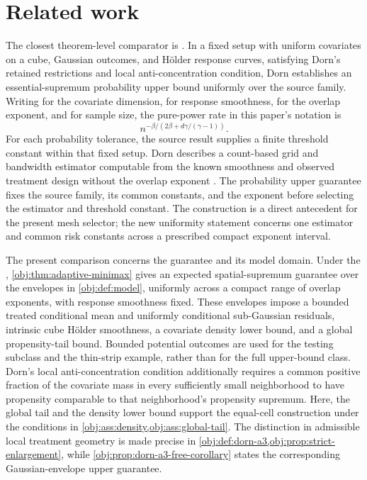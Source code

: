 \section{Related work}

The closest theorem-level comparator is \citet[Assumptions 1--3 and Theorem 1(ii), p. 12]{Dorn2026GlobalOverlap}. In a fixed setup with uniform covariates on a cube, Gaussian outcomes, and Hölder response curves, satisfying Dorn's retained restrictions and local anti-concentration condition, Dorn establishes an essential-supremum probability upper bound uniformly over the source family. Writing  for the covariate dimension,  for response smoothness,  for the overlap exponent, and  for sample size, the pure-power rate in this paper's notation is
\[
n^{-\beta/(2\beta+d\gamma/(\gamma-1))}.
\]
For each probability tolerance, the source result supplies a finite threshold constant within that fixed setup. Dorn describes a count-based grid and bandwidth estimator computable from the known smoothness and observed treatment design without the overlap exponent \citep[Lemmas 11 and 13, pp. 23--24; proof, pp. 27--28]{Dorn2026GlobalOverlap}. The probability upper guarantee fixes the source family, its common constants, and the exponent before selecting the estimator and threshold constant. The construction is a direct antecedent for the present mesh selector; the new uniformity statement concerns one estimator and common risk constants across a prescribed compact exponent interval.

The present comparison concerns the guarantee and its model domain. Under the , \cref{obj:thm:adaptive-minimax} gives an expected spatial-supremum guarantee over the envelopes in \cref{obj:def:model}, uniformly across a compact range of overlap exponents, with response smoothness fixed. These envelopes impose a bounded treated conditional mean and uniformly conditional sub-Gaussian residuals, intrinsic cube Hölder smoothness, a covariate density lower bound, and a global propensity-tail bound. Bounded potential outcomes are used for the testing subclass and the thin-strip example, rather than for the full upper-bound class. Dorn's local anti-concentration condition additionally requires a common positive fraction of the covariate mass in every sufficiently small neighborhood to have propensity comparable to that neighborhood's propensity supremum. Here, the global tail and the density lower bound support the equal-cell construction under the conditions in \cref{obj:ass:density,obj:ass:global-tail}. The distinction in admissible local treatment geometry is made precise in \cref{obj:def:dorn-a3,obj:prop:strict-enlargement}, while \cref{obj:prop:dorn-a3-free-corollary} states the corresponding Gaussian-envelope upper guarantee.

